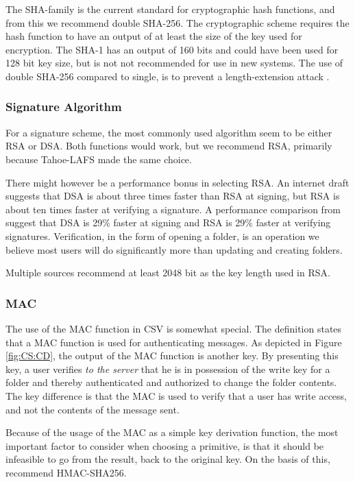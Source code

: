 \documentclass[pdftex,english,10pt,b5paper,twoside]{book}
\begin{document}
The \ac{SHA}-family is the current standard for cryptographic hash functions,
and from this we recommend double \ac{SHA}-256. The cryptographic scheme
requires the hash function to have an output of at least the size of the key
used for encryption. The \ac{SHA}-1 has an output of 160 bits and could have
been used for 128 bit key size, but is not not recommended for use in new
systems\cite{nist_sha1}. The use of double \ac{SHA}-256 compared to single, is
to prevent a length-extension attack \cite{schneier}.


\subsubsection{Signature Algorithm}

For a signature scheme, the most commonly used algorithm seem to be either
\ac{RSA} or \ac{DSA}.  Both functions would work, but we recommend \ac{RSA},
primarily because Tahoe-\ac{LAFS} made the same choice.

There might however be a performance bonus in selecting \ac{RSA}. An internet
draft \cite{dsa_sha2} suggests that \ac{DSA} is about three times faster than
\ac{RSA} at signing, but \ac{RSA} is about ten times faster at verifying a
signature. A performance comparison from \citet{msdn_perf} suggest that
\ac{DSA} is 29\% faster at signing and \ac{RSA} is 29\% faster at verifying
signatures. Verification, in the form of opening a folder, is an operation we
believe most users will do significantly more than updating and creating
folders.

Multiple sources \cite{keylength} recommend at least 2048 bit as the key length
used in \ac{RSA}.

\subsubsection{\ac{MAC}}

The use of the \ac{MAC} function in \ac{CSV} is somewhat special. The
definition states that a MAC function is used for authenticating messages.  As
depicted in Figure \ref{fig:CS:CD}, the output of the \ac{MAC} function is
another key. By presenting this key, a user verifies \emph{to the server} that
he is in possession of the write key for a folder and thereby authenticated and
authorized to change the folder contents. The key difference is that the
\ac{MAC} is used to verify that a user has write access, and not the contents
of the message sent.

Because of the usage of the \ac{MAC} as a simple key derivation function, the
most important factor to consider when choosing a primitive, is that it should
be infeasible to go from the result, back to the original key. On the basis of
this, \citet{schneier} recommend HMAC-SHA256.
\end{document}
